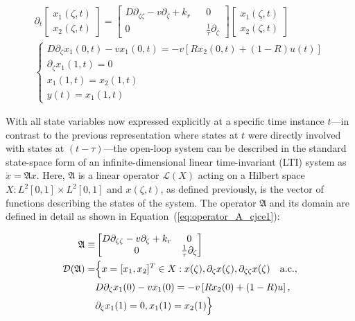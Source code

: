 \begin{align}
    \partial_t 
    \begin{bmatrix}
        x_1(\zeta, t) \\ x_2(\zeta,t)
    \end{bmatrix}
    =
    \begin{bmatrix}
        D \partial_{\zeta \zeta} - v \partial_\zeta + k_r && 0 \\
        0 && \frac{1}{\tau} \partial_\zeta
    \end{bmatrix}
    \begin{bmatrix}
        x_1(\zeta, t) \\ x_2(\zeta,t)
    \end{bmatrix}\\
\begin{cases}
    D \partial_\zeta x_1(0, t) - v x_1(0, t) = -v \left[ R x_2(0, t) + (1-R) u(t) \right] \\
    \partial_\zeta x_1(1, t) = 0 \\
    x_1(1,t) = x_2(1,t) \\
    y(t) = x_1(1, t)
\end{cases}
\end{align}

With all state variables now expressed explicitly at a specific time instance $t$—in contrast to the previous representation where states at $t$ were directly involved with states at $(t-\tau)$—the open-loop system can be described in the standard state-space form of an infinite-dimensional linear time-invariant (LTI) system as $\dot{{x}} = \mathfrak{A} {x}$. Here, $\mathfrak{A}$ is a linear operator $\mathcal{L}(X)$ acting on a Hilbert space $X: L^2[0,1] \times L^2[0,1]$ and ${x}(\zeta,t)$, as defined previously, is the vector of functions describing the states of the system. The operator $\mathfrak{A}$ and its domain are defined in detail as shown in Equation~(\ref{eq:operator_A_cjce1}):

\begin{equation} \label{eq:operator_A_cjce1}
    \begin{aligned}
        \mathfrak{A} \equiv&
        \begin{bmatrix}
            D \partial_{\zeta \zeta} - v \partial_\zeta + k_r & 0 \\
            0 & \frac{1}{\tau} \partial_\zeta
        \end{bmatrix}\\
        \mathcal{D}(\mathfrak{A}) =& \Bigl\{ {x} = [x_1, x_2]^T \in X:
        {x}(\zeta), \partial_\zeta {x}(\zeta), \partial_{\zeta \zeta} {x}(\zeta) \quad \mathrm{a.c.},\\
        &D \partial_\zeta x_1(0) - v x_1(0) = -v \left[ R x_2(0) + (1-R) u \right],\\
        &\partial_\zeta x_1(1) = 0,
        x_1(1) = x_2(1) \Bigr\}
    \end{aligned}
\end{equation}

